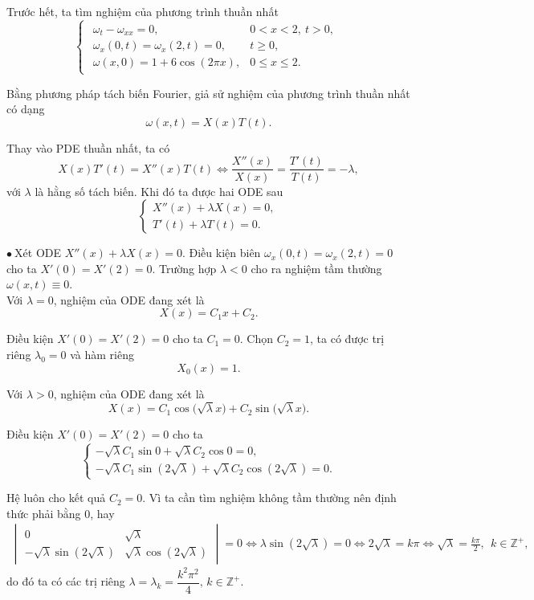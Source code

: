 \documentclass[10pt, a4paper]{article}
\begin{document}
	Trước hết, ta tìm nghiệm của phương trình thuần nhất $$\begin{cases}
		\begin{array}{ll}
			\omega_{t}-\omega_{xx}=0, & 0<x<2,~t>0,\\
			\omega_x(0,t)=\omega_x(2,t)=0, & t\ge0,\\
			\omega(x,0)=1+6\cos(2\pi x), & 0\le x\le 2.
		\end{array}
	\end{cases}$$
	
	Bằng phương pháp tách biến Fourier, giả sử nghiệm của phương trình thuần nhất có dạng $$\omega(x,t)=X(x)T(t).$$
	
	Thay vào PDE thuần nhất, ta có $$X(x)T'(t)=X''(x)T(t)\iff\frac{X''(x)}{X(x)}=\frac{T'(t)}{T(t)}=-\lambda,$$
	với $\lambda$ là hằng số tách biến. Khi đó ta được hai ODE sau $$\begin{cases}
		X''(x)+\lambda X(x)=0,\\
		T'(t)+\lambda T(t)=0.
	\end{cases}$$
	
	$\bullet~$Xét ODE $X''(x)+\lambda X(x)=0$. Điều kiện biên $\omega_x(0,t)=\omega_x(2,t)=0$ cho ta $X'(0)=X'(2)=0$. Trường hợp $\lambda<0$ cho ra nghiệm tầm thường $\omega(x,t)\equiv0$.\\
	
	Với $\lambda=0$, nghiệm của ODE đang xét là $$X(x)=C_1x+C_2.$$
	
	Điều kiện $X'(0)=X'(2)=0$ cho ta $C_1=0$. Chọn $C_2=1$, ta có được trị riêng $\lambda_0=0$ và hàm riêng $$X_0(x)=1.$$
	
	Với $\lambda>0$, nghiệm của ODE đang xét là $$X(x)=C_1\cos\big(\sqrt\lambda x\big)+C_2\sin\big(\sqrt\lambda x\big).$$
	
	Điều kiện $X'(0)=X'(2)=0$ cho ta $$\begin{cases}
		-\sqrt\lambda C_1\sin0+\sqrt\lambda C_2\cos0=0,\\
		-\sqrt\lambda C_1\sin(2\sqrt{\lambda})+\sqrt\lambda C_2\cos(2\sqrt{\lambda})=0.
	\end{cases}$$
	
	Hệ luôn cho kết quả $C_2=0$. Vì ta cần tìm nghiệm không tầm thường nên định thức phải bằng 0, hay \begin{align*}
		\begin{vmatrix}
			0&\sqrt\lambda\\
			-\sqrt\lambda\sin(2\sqrt{\lambda})&\sqrt\lambda\cos(2\sqrt{\lambda})
		\end{vmatrix}=0\iff\lambda\sin(2\sqrt{\lambda})=0\iff2\sqrt{\lambda}=k\pi\iff\sqrt\lambda=\frac{k\pi}{2},~~k\in\mathbb Z^+,
	\end{align*}
	do đó ta có các trị riêng $\lambda=\lambda_k=\dfrac{k^2\pi^2}{4},\,k\in\mathbb Z^+$.\\
	
\end{document}
